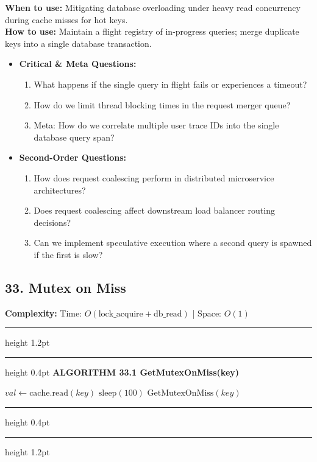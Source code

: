 \documentclass[11pt,a4paper]{article}
\newenvironment{textbookalgo}[2]{%
  \par\addvspace{1.2em}\noindent
  \hrule height 1.2pt
  \vspace{1.5pt}
  \hrule height 0.4pt
  \vspace{5pt}
  {\noindent\large\bfseries\sffamily ALGORITHM #1 \quad #2}
  \par\vspace{5pt}
  \RestyleAlgo{plain}
}{%
  \par\vspace{4pt}
  \hrule height 0.4pt
  \vspace{1.5pt}
  \hrule height 1.2pt
  \par\addvspace{1.2em}
}
\theoremstyle{definition}
\begin{document}
\noindent
\textbf{When to use:} Mitigating database overloading under heavy read concurrency during cache misses for hot keys.\\
\textbf{How to use:} Maintain a flight registry of in-progress queries; merge duplicate keys into a single database transaction.
\begin{itemize}[leftmargin=*]
  \item[] \textbf{Critical \& Meta Questions:}
  \begin{enumerate}
    \item What happens if the single query in flight fails or experiences a timeout?
    \item How do we limit thread blocking times in the request merger queue?
    \item Meta: How do we correlate multiple user trace IDs into the single database query span?
  \end{enumerate}
  \item[] \textbf{Second-Order Questions:}
  \begin{enumerate}
    \item How does request coalescing perform in distributed microservice architectures?
    \item Does request coalescing affect downstream load balancer routing decisions?
    \item Can we implement speculative execution where a second query is spawned if the first is slow?
  \end{enumerate}
\end{itemize}
\medskip


\clearpage
\subsection{33. Mutex on Miss}

\noindent
\textbf{Complexity:} Time: $O(\text{lock\_acquire} + \text{db\_read})$ | Space: $O(1)$
\smallskip

\begin{textbookalgo}{33.1}{GetMutexOnMiss(key)}
\begin{algorithm}[H]
$val \leftarrow \text{cache.read}(key)$\;
$\text{sleep}(100)$\;
\Return $\text{GetMutexOnMiss}(key)$\;
\end{algorithm}
\end{textbookalgo}
\end{document}
